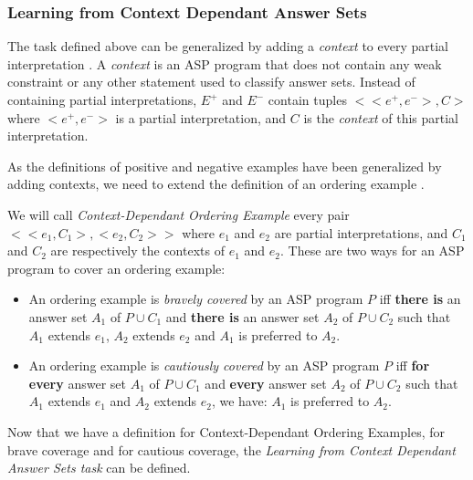 \subsubsection{Learning from Context Dependant Answer Sets}

The task defined above can be generalized by adding a \textit{context} to every partial interpretation \citep{law2016context}. A \textit{context} is an ASP program that does not contain any weak constraint or any other statement used to classify answer sets. Instead of containing partial interpretations, $E^+$ and $E^-$ contain tuples $<<e^+,e^->,C>$ where $<e^+,e^->$ is a partial interpretation, and $C$ is the \textit{context} of this partial interpretation. 

\bigskip

As the definitions of positive and negative examples have been generalized by adding contexts, we need to extend the definition of an ordering example \citep{law2016context}.

\begin{definition}

We will call \textit{Context-Dependant Ordering Example} every pair $<<e_1,C_1>,<e_2,C_2>>$ where $e_1$ and $e_2$ are partial interpretations, and $C_1$ and $C_2$ are respectively the contexts of $e_1$ and $e_2$. These are two ways for an ASP program to cover an ordering example:
\begin{itemize}
\item An ordering example is \textit{bravely covered} by an ASP program $P$ iff \textbf{there is} an answer set $A_1$ of $P\cup C_1$ and \textbf{there is} an answer set $A_2$ of $P\cup C_2$ such that $A_1$ extends $e_1$, $A_2$ extends $e_2$ and $A_1$ is preferred to $A_2$.
\item An ordering example is \textit{cautiously covered} by an ASP program $P$ iff \textbf{for every} answer set $A_1$ of $P\cup C_1$ and \textbf{every} answer set $A_2$ of $P\cup C_2$ such that $A_1$ extends $e_1$ and $A_2$ extends $e_2$, we have: $A_1$ is preferred to $A_2$.
\end{itemize}

\end{definition}
Now that we have a definition for Context-Dependant Ordering Examples, for brave coverage and for cautious coverage, the \textit{Learning from Context Dependant Answer Sets task} can be defined.

